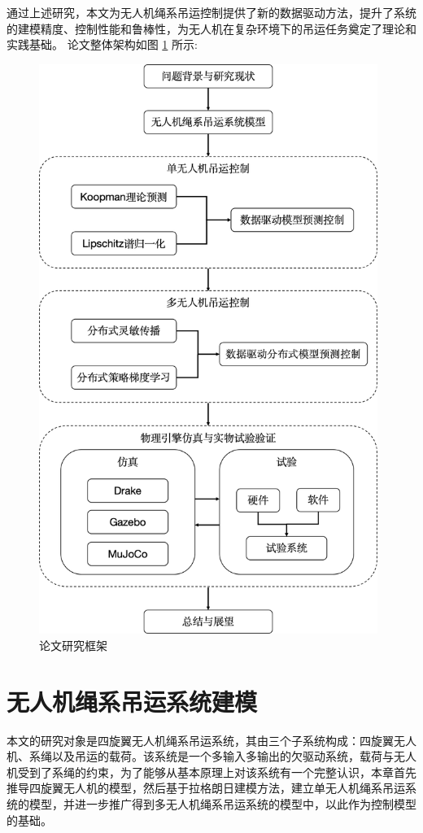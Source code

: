 \documentclass[lang=chs, degree=master, blindreview=false, winfonts=true]{yanputhesis}
\begin{document}
通过上述研究，本文为无人机绳系吊运控制提供了新的数据驱动方法，提升了系统的建模精度、控制性能和鲁棒性，为无人机在复杂环境下的吊运任务奠定了理论和实践基础。
论文整体架构如图 \ref{1_0} 所示:

\begin{figure}[hbt!]
	\centering
	\includegraphics[width=26pc]{picture/1_0.png} 
	\caption{论文研究框架} \label{1_0}
\end{figure}

\cleardoublepage

\chapter{无人机绳系吊运系统建模}
本文的研究对象是四旋翼无人机绳系吊运系统，其由三个子系统构成：四旋翼无人机、系绳以及吊运的载荷。该系统是一个多输入多输出的欠驱动系统，载荷与无人机受到了系绳的约束，为了能够从基本原理上对该系统有一个完整认识，本章首先推导四旋翼无人机的模型，然后基于拉格朗日建模方法，建立单无人机绳系吊运系统的模型，并进一步推广得到多无人机绳系吊运系统的模型中，以此作为控制模型的基础。
\end{document}
